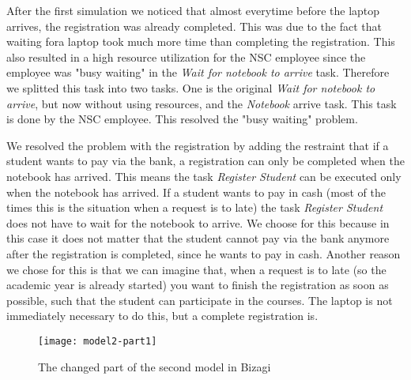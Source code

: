 After the first simulation we noticed that almost everytime before the laptop arrives, the registration was already completed.
This was due to the fact that waiting fora laptop took much more time than completing the registration.
This also resulted in a  high resource utilization for the NSC employee since the employee was "busy waiting" in the \emph{Wait for notebook to arrive} task.
Therefore we splitted this task into two tasks. One is the original \emph{Wait for notebook to arrive}, but now without using resources, and the \emph{Notebook} arrive task.
This task is done by the NSC employee. This resolved the "busy waiting" problem.

We resolved the problem with the registration by adding the restraint that if a student wants to pay via the bank, a registration can only be completed when the notebook has arrived.
This means the task \emph{Register Student} can be executed only when the notebook has arrived.
If a student wants to pay in cash (most of the times this is the situation when a request is to late) the task \emph{Register Student} does not have to wait for the notebook to arrive.
We choose for this because in this case it does not matter that the student cannot pay via the bank anymore after the registration is completed, since he wants to pay in cash.
Another reason we chose for this is that we can imagine that,
when a request is to late (so the academic year is already started) you want to finish the registration as soon as possible, such that the student can participate in the courses.
The laptop is not immediately necessary to do this, but a complete registration is.

\begin{figure}[H]
	\centering
	\texttt{[image: model2-part1]}
	\caption{The changed part of the second model in Bizagi}
	\label{fig:model2-part1}
\end{figure}
